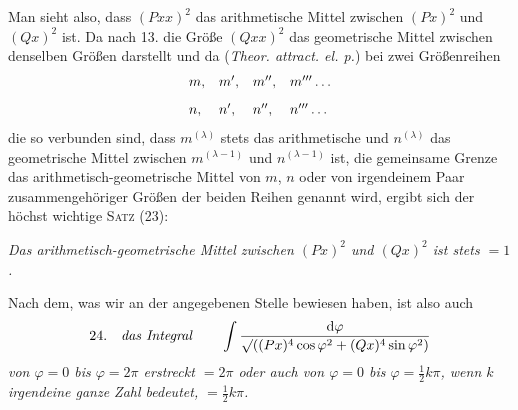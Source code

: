 Man sieht also, dass $(Pxx)^2$ das arithmetische Mittel zwischen $(Px)^2$ und $(Qx)^2$ ist. Da nach 13. die Größe $(Qxx)^2$ das geometrische Mittel zwischen denselben Größen darstellt und da (\textit{Theor. attract. el. p.}) bei zwei Größenreihen
\[
\begin{array}{llll}
m,&m',&m'',&m'''\mathinner{.\,.\,.}\\[8pt]
n,&n',&n'',&n'''\mathinner{.\,.\,.}
\end{array}
\]
die so verbunden sind, dass $m^{(\lambda)}$ stets das arithmetische und $n^{(\lambda)}$ das geometrische Mittel zwischen $m^{(\lambda-1)}$ und $n^{(\lambda-1)}$ ist, die gemeinsame Grenze das arithmetisch-geometrische Mittel von $m$, $n$ oder von irgendeinem Paar zusammengehöriger Größen der beiden Reihen genannt wird, ergibt sich der höchst wichtige \textsc{Satz} (23):

\textit{Das arithmetisch-geometrische Mittel zwischen $(Px)^2$ und $(Qx)^2$ ist stets $=1$.}


Nach dem, was wir an der angegebenen Stelle bewiesen haben, ist also auch
\[
24.\quad\text{\textit{das Integral}}\qquad
\int\frac{\mathrm{d}\varphi}{\mathord{\surd}{((Px)^4\cos\varphi^2+(Qx)^4\sin\varphi^2)}}
\]
\textit{von $\varphi=0$ bis $\varphi=2\pi$ erstreckt $=2\pi$ oder auch von $\varphi=0$ bis $\varphi=\tfrac12k\pi$, wenn $k$ irgendeine ganze Zahl bedeutet, $=\tfrac12k\pi$.}

\clearpage
\endgroup
